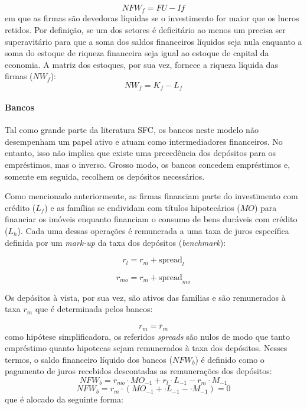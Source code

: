 \begin{equation}
    NFW_f = FU - If
\end{equation}
em que as firmas são devedoras líquidas se o investimento for maior que os lucros retidos. Por definição, se um dos setores é deficitário ao menos um precisa ser superavitário para que a soma dos saldos financeiros líquidos seja nula enquanto a soma do estoque de riqueza financeira seja igual ao estoque de capital da economia. A matriz dos estoques, por sua vez, fornece a riqueza líquida das firmas ($NW_f$):
\begin{equation}
    NW_f = K_f - L_f
\end{equation}

\paragraph*{Bancos} Tal como grande parte da literatura SFC, os bancos neste modelo não desempenham um papel ativo e atuam como intermediadores financeiros. No entanto, isso não implica que existe uma precedência dos depósitos para os empréstimos, mas o inverso. Grosso modo, os bancos concedem empréstimos e, somente em seguida, recolhem os depósitos necessários. 

Como mencionado anteriormente, as firmas financiam parte do investimento com crédito ($L_f$) e as famílias se endividam com títulos hipotecários ($MO$) para financiar os imóveis enquanto financiam o consumo de bens duráveis com crédito ($L_h$). Cada uma dessas operações é remunerada a uma taxa de juros específica definida por um \textit{mark-up} da taxa dos depósitos (\textit{benchmark}):

\begin{equation}
    r_l = r_m + \text{spread}_l
\end{equation}

\begin{equation}
    r_{mo} = r_m + \text{spread}_{mo}
\end{equation}

Os depósitos à vista, por sua vez, são ativos das famílias e são remunerados à taxa $r_m$ que é determinada pelos bancos:

\begin{equation}
    r_m = \overline r_m
\end{equation}
como hipótese simplificadora, os referidos \textit{spreads} são nulos de modo que tanto empréstimo quanto hipotecas sejam remunerados à taxa dos depósitos. Nesses termos, o saldo financeiro líquido dos bancos ($NFW_b$) é definido como o pagamento de juros recebidos descontadas as remunerações dos depósitos:
\begin{equation}
    NFW_b = r_{mo}\cdot MO_{-1} + r_l\cdot L_{-1} - r_m\cdot M_{-1}
\end{equation}
$$
    NFW_b = r_{m}\cdot (MO_{-1} + \cdot L_{-1} - \cdot M_{-1}) = 0
$$
que é alocado da seguinte forma:

